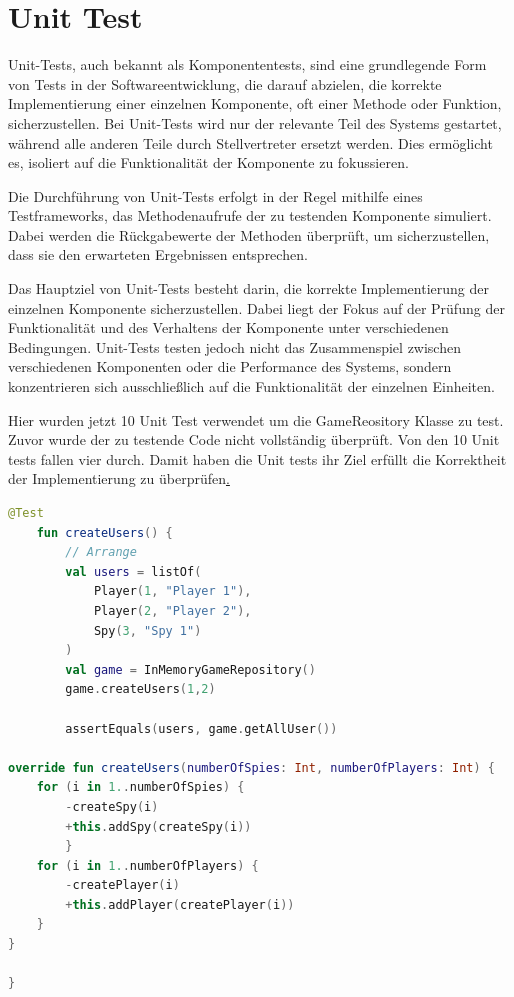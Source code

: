 \section{Unit Test}
Unit-Tests, auch bekannt als Komponententests, sind eine grundlegende Form von Tests in der Softwareentwicklung, die darauf abzielen, die korrekte Implementierung einer einzelnen Komponente, oft einer Methode oder Funktion, sicherzustellen. Bei Unit-Tests wird nur der relevante Teil des Systems gestartet, während alle anderen Teile durch Stellvertreter ersetzt werden. Dies ermöglicht es, isoliert auf die Funktionalität der Komponente zu fokussieren.

Die Durchführung von Unit-Tests erfolgt in der Regel mithilfe eines Testframeworks, das Methodenaufrufe der zu testenden Komponente simuliert. Dabei werden die Rückgabewerte der Methoden überprüft, um sicherzustellen, dass sie den erwarteten Ergebnissen entsprechen.

Das Hauptziel von Unit-Tests besteht darin, die korrekte Implementierung der einzelnen Komponente sicherzustellen. Dabei liegt der Fokus auf der Prüfung der Funktionalität und des Verhaltens der Komponente unter verschiedenen Bedingungen. Unit-Tests testen jedoch nicht das Zusammenspiel zwischen verschiedenen Komponenten oder die Performance des Systems, sondern konzentrieren sich ausschließlich auf die Funktionalität der einzelnen Einheiten.

Hier wurden jetzt 10 Unit Test verwendet um die GameReository Klasse zu test. Zuvor wurde der zu testende Code nicht vollständig überprüft. Von den 10 Unit tests fallen vier durch. Damit haben die Unit tests ihr Ziel erfüllt die Korrektheit der Implementierung zu überprüfen\href{https://github.com/lorenz1702/Spy-Game/commit/9142232564a086007dc335c17d2dc9fa30309729}.

\begin{lstlisting}[language=Kotlin, caption={Test and the wrong code}, label={lst:1}]
    @Test
    fun createUsers() {
        // Arrange
        val users = listOf(
            Player(1, "Player 1"),
            Player(2, "Player 2"),
            Spy(3, "Spy 1")
        )
        val game = InMemoryGameRepository()
        game.createUsers(1,2)

        assertEquals(users, game.getAllUser())

override fun createUsers(numberOfSpies: Int, numberOfPlayers: Int) {
    for (i in 1..numberOfSpies) {
        -createSpy(i)
        +this.addSpy(createSpy(i))
        }
    for (i in 1..numberOfPlayers) {
        -createPlayer(i)
        +this.addPlayer(createPlayer(i))
    }
}

}
    
\end{lstlisting}

